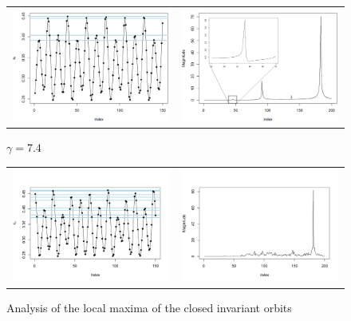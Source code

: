 \documentclass[10pt]{Configuration_Files/PoliMi3i_thesis}
\begin{document}
\begin{figure}[!h]
\begin{tabular}{cc}
    \includegraphics[width=0.45\linewidth]{images/Chapter 6.3/unnamed-chunk-7-1.png} &
    \includegraphics[width=0.45\linewidth]{images/Chapter 6.3/unnamed-chunk-8-1.png} 
    \end{tabular}
\end{figure}
\begin{figure}[!h]
\centering  
 \textbf{\footnotesize{$\gamma=7.4$}}   
    \begin{tabular}{cc}
    \includegraphics[width=0.45\linewidth]{images/Chapter 6.3/unnamed-chunk-9-1.png} &
    \includegraphics[width=0.45\linewidth]{images/Chapter 6.3/unnamed-chunk-10-1.png} &
    \end{tabular}
   \caption{Analysis of the local maxima of the closed invariant orbits}
   \label{fig:Chaotic_fourier}
\end{figure}
\end{document}
